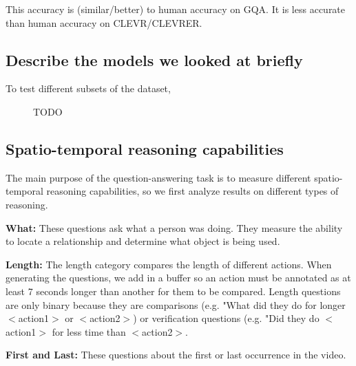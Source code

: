 \documentclass[10pt,twocolumn,letterpaper]{article}
\newcommand{\mgm}[1]{{\color{cyan}{mgm: #1}}}
\begin{document}
This accuracy is (similar/better) to human accuracy on GQA. It is less accurate than human accuracy on CLEVR/CLEVRER. 

\mgm{Get numbers}

\subsection{Describe the models we looked at briefly}

To test different subsets of the dataset, 

\mgm{Is it necessary to do this? CLEVR did, GQA did not}
%

\begin{figure}[t]
\begin{center}
\resizebox{\linewidth}{!}{

}
\end{center}
   \caption{TODO}
\label{global results}
\end{figure}



\subsection{Spatio-temporal reasoning capabilities}
The main purpose of the question-answering task is to measure different spatio-temporal reasoning capabilities, so we first analyze results on different types of reasoning. 

\textbf{What: } \mgm{dear jesus come up with a less terrible name} These questions ask what a person was doing. They measure the ability to locate a relationship and determine what object is being used. \mgm{this expl will change if we add in actions}

\textbf{Length: } The length category compares the length of different actions. When generating the questions, we add in a buffer so an action must be annotated as at least 7 seconds longer than another for them to be compared. Length questions are only binary because they are comparisons (e.g. "What did they do for longer $<$action1$>$ or $<$action2$>$) or verification questions (e.g. "Did they do $<$action1$>$ for less time than $<$action2$>$.

\textbf{First and Last: } These questions about the first or last occurrence in the video. 
\end{document}
